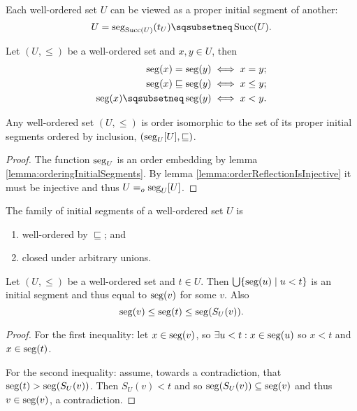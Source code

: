 Each well-ordered set $U$ can be viewed as a proper initial segment of another:
\[ U = \seg_{\operatorname{Succ}(U)}(t_U)\sqsubsetneq \operatorname{Succ}(U). \]
\begin{lemma} \label{lemma:orderingInitialSegments}
Let $(U,\leq)$ be a well-ordered set and $x,y\in U$, then
\begin{align*}
\seg(x) = \seg(y) &\iff x = y; \\
\seg(x) \sqsubseteq \seg(y) &\iff x \leq y; \\
\seg(x) \sqsubsetneq \seg(y) &\iff x < y.
\end{align*}
\end{lemma}
\begin{proposition} \label{prop:wosetIsomorphicToInitialSegments}
Any well-ordered set $(U,\leq)$ is order isomorphic to the set of its proper initial segments ordered by inclusion, $(\operatorname{seg}_U[U], \sqsubseteq)$.
\end{proposition}
\begin{proof}
The function $\operatorname{seg}_U$ is an order embedding by lemma \ref{lemma:orderingInitialSegments}. By lemma \ref{lemma:orderReflectionIsInjective} it must be injective and thus $U =_o \operatorname{seg}_U[U]$.
\end{proof}
\begin{lemma}
The family of initial segments of a well-ordered set $U$ is
\begin{enumerate}
\item well-ordered by $\sqsubseteq$; and
\item closed under arbitrary unions.
\end{enumerate}
\end{lemma}
\begin{lemma} \label{lemma:unionInitialSegments}
Let $(U,\leq)$ be a well-ordered set and $t\in U$. Then $\bigcup\{ \operatorname{seg}(u)\;|\; u<t \}$ is an initial segment and thus equal to $\operatorname{seg}(v)$ for some $v$. Also
\[ \operatorname{seg}(v) \leq \operatorname{seg}(t) \leq \operatorname{seg}(S_U(v)). \]
\end{lemma}
\begin{proof}
For the first inequality: let $x\in \operatorname{seg}(v)$, so $\exists u<t: x\in\operatorname{seg}(u)$ so $x<t$ and $x\in \operatorname{seg}(t)$.

For the second inequality: assume, towards a contradiction, that $\operatorname{seg}(t)>\operatorname{seg}(S_U(v))$. Then $S_U(v) < t$ and so $\operatorname{seg}(S_U(v))\subseteq \operatorname{seg}(v)$ and thus $v\in\operatorname{seg}(v)$, a contradiction.
\end{proof}

